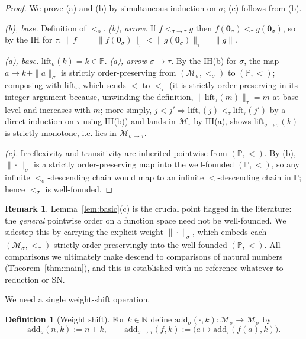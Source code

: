 \documentclass{amsart}
\theoremstyle{definition}
\newtheorem{definition}{Definition}
\newtheorem{remark}{Remark}
\begin{document}
\begin{proof}
We prove (a) and (b) by simultaneous induction on $\sigma$; (c) follows from (b).

\emph{(b), base.} Definition of $<_o$.
\emph{(b), arrow.} If $f<_{\sigma\to\tau}g$ then $f(\mathbf 0_\sigma)<_\tau g(\mathbf 0_\sigma)$,
so by the IH for $\tau$, $\|f\|=\|f(\mathbf 0_\sigma)\|_\tau<\|g(\mathbf 0_\sigma)\|_\tau=\|g\|$.

\emph{(a), base.} $\mathrm{lift}_o(k)=k\in\mathbb P$.
\emph{(a), arrow $\sigma\to\tau$.} By the IH(b) for $\sigma$, the map
$a\mapsto k+\|a\|_\sigma$ is strictly order-preserving from $(\mathcal M_\sigma,<_\sigma)$
to $(\mathbb P,<)$; composing with $\mathrm{lift}_\tau$, which sends $<$ to $<_\tau$
(it is strictly order-preserving in its integer argument because, unwinding the
definition, $\|\mathrm{lift}_\tau(m)\|_\tau=m$ at base level and increases with $m$;
more simply, $j<j'\Rightarrow\mathrm{lift}_\tau(j)<_\tau\mathrm{lift}_\tau(j')$ by a
direct induction on $\tau$ using IH(b)) and lands in $\mathcal M_\tau$ by IH(a), shows
$\mathrm{lift}_{\sigma\to\tau}(k)$ is strictly monotone, i.e. lies in
$\mathcal M_{\sigma\to\tau}$.

\emph{(c).} Irreflexivity and transitivity are inherited pointwise from $(\mathbb P,<)$.
By (b), $\|\cdot\|_\sigma$ is a strictly order-preserving map into the well-founded
$(\mathbb P,<)$, so any infinite $<_\sigma$-descending chain would map to an infinite
$<$-descending chain in $\mathbb P$; hence $<_\sigma$ is well-founded.
\end{proof}

\begin{remark}
Lemma~\ref{lem:basic}(c) is the crucial point flagged in the literature: the
\emph{general} pointwise order on a function space need not be well-founded. We sidestep
this by carrying the explicit weight $\|\cdot\|_\sigma$, which embeds each
$(\mathcal M_\sigma,<_\sigma)$ strictly-order-preservingly into the well-founded
$(\mathbb P,<)$. All comparisons we ultimately make descend to comparisons of natural
numbers (Theorem~\ref{thm:main}), and this is established with no reference whatever to
reduction or SN.
\end{remark}

We need a single weight-shift operation.

\begin{definition}[Weight shift]\label{def:add}
For $k\in\mathbb N$ define $\mathrm{add}_\sigma(\cdot,k):\mathcal M_\sigma\to\mathcal M_\sigma$ by
\[
  \mathrm{add}_o(n,k):=n+k,\qquad
  \mathrm{add}_{\sigma\to\tau}(f,k):=\bigl(a\mapsto\mathrm{add}_\tau(f(a),k)\bigr).
\]
\end{definition}
\end{document}
